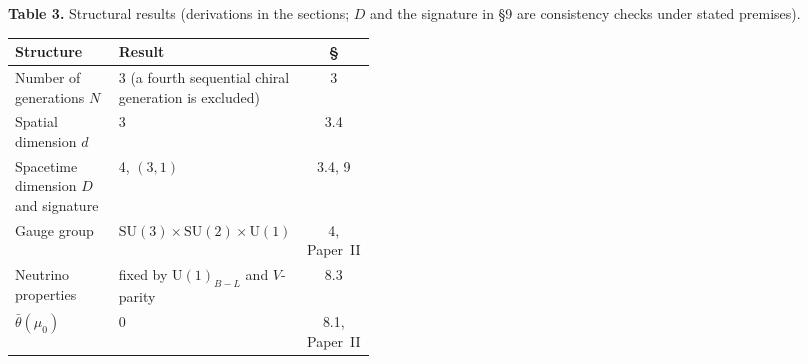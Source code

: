 \documentclass[12pt,a4paper]{article}
\begin{document}
\bigskip\noindent\textbf{Table 3.} Structural results (derivations in the sections; $D$ and the signature in \S9 are consistency checks under stated premises).
\nopagebreak[4]
\begin{center}\footnotesize\setlength{\tabcolsep}{4pt}
\begin{tabular}{@{}l p{0.42\linewidth} c@{}}
\toprule
Structure & Result & \S \\
\midrule
Number of generations $N$ & 3 (a fourth sequential chiral generation is excluded) & 3 \\
Spatial dimension $d$ & 3 & 3.4 \\
Spacetime dimension $D$ and signature & 4, $(3,1)$ & 3.4, 9 \\
Gauge group & $\mathrm{SU}(3){\times}\mathrm{SU}(2){\times}\mathrm{U}(1)$ & 4, Paper~II \\
Neutrino properties & fixed by $\mathrm{U}(1)_{B-L}$ and $V$-parity & 8.3 \\
$\bar\theta(\mu_0)$ & 0 & 8.1, Paper~II \\
\bottomrule
\end{tabular}
\end{center}
\end{document}
